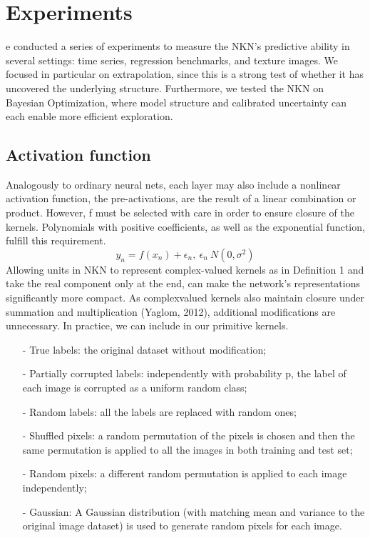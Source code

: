 \documentclass[9pt,a4paper,twoside]{tau}
\begin{document}
	
    \thispagestyle{firststyle}
    \tableofcontents


\section{Experiments}

    e conducted a series of experiments to measure the NKN’s predictive ability in several settings: time series, regression benchmarks, and texture images. We focused in particular on extrapolation, since this is a strong test of whether it has uncovered the underlying structure. Furthermore, we tested the NKN on Bayesian Optimization, where model structure and calibrated uncertainty can each enable more efficient exploration.

    \subsection{Activation function}
	
        Analogously to ordinary neural nets, each layer may also include a nonlinear activation function, the pre-activations, are the result of a linear combination or product. However, f must be selected with care in order to ensure closure of the kernels. Polynomials with positive coefficients, as well as the exponential function, fulfill this requirement.
        \begin{equation} \label{ec:f1}
			y_{n} = f(x_n) + \epsilon_n,\ \epsilon_n ~ N(0,\sigma^2)
		\end{equation} 
  Allowing units in NKN to represent complex-valued kernels as in Definition 1 and take the real component only at the end, can make the network’s representations significantly more compact. As complexvalued kernels also maintain closure under summation and multiplication (Yaglom, 2012), additional modifications are unnecessary. In practice, we can include in our primitive kernels.
  \begin{itemize}
  \item[-]True labels: the original dataset without modification;
  \item[-] Partially corrupted labels: independently with probability p, the label of each image is corrupted as a uniform random class;
  \item[-] Random labels: all the labels are replaced with random ones; 
   \item[-]Shuffled pixels: a random permutation of the pixels is chosen and then the same permutation is applied to all the images in both training and test set;
  \item[-] Random pixels: a different random permutation is applied to each image independently; 
  \item[-]Gaussian: A Gaussian distribution (with matching mean and variance to the original image dataset) is used to generate random pixels for each image.
  \end{itemize}
\end{document}
